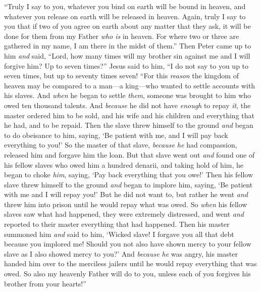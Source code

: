 \begin{biblechapter}
\verse “Truly I say to you, whatever you bind on earth will be bound in heaven, and whatever you release on earth will be released in heaven.
\verse Again, truly I say to you that if two of you agree on earth about any matter that they ask, it will be done for them from my Father \textit{who is} in heaven.
\verse For where two or three are gathered in my name, I am there in the midst of them.”
 Then Peter came up to him \textit{and} said, “Lord, how many times will my brother sin against me and I will forgive him? Up to seven times?”
\verse Jesus said to him, “I do not say to you up to seven times, but up to seventy times seven!
\verse “For this \textit{reason} the kingdom of heaven may be compared to a man—a king—who wanted to settle accounts with his slaves.
\verse And \textit{when} he began to settle \textit{them}, someone was brought to him who owed ten thousand talents.
\verse And \textit{because} he did not have \textit{enough} to repay \textit{it}, the master ordered him to be sold, and his wife and his children and everything that he had, and to be repaid.
\verse Then the slave threw himself to the ground \textit{and} began to do obeisance to him, saying, ‘Be patient with me, and I will pay back everything to you!’
\verse So the master of that slave, \textit{because he} had compassion, released him and forgave him the loan.
\verse But that slave went out \textit{and} found one of his fellow slaves who owed him a hundred denarii, and taking hold of him, he began to choke \textit{him}, saying, ‘Pay back everything that you owe!’
\verse Then his fellow slave threw himself to the ground \textit{and} began to implore him, saying, ‘Be patient with me and I will repay you!’
\verse But he did not want to, but rather he went \textit{and} threw him into prison until he would repay what was owed.
\verse So \textit{when} his fellow slaves saw what had happened, they were extremely distressed, and went \textit{and} reported to their master everything that had happened.
\verse Then his master summoned him \textit{and} said to him, ‘Wicked slave! I forgave you all that debt because you implored me!
\verse Should you not also have shown mercy to your fellow slave as I also showed mercy to you?’
\verse And \textit{because he} was angry, his master handed him over to the merciless jailers until he would repay everything that was owed.
\verse So also my heavenly Father will do to you, unless each of you forgives his brother from your hearts!”
\end{biblechapter}

